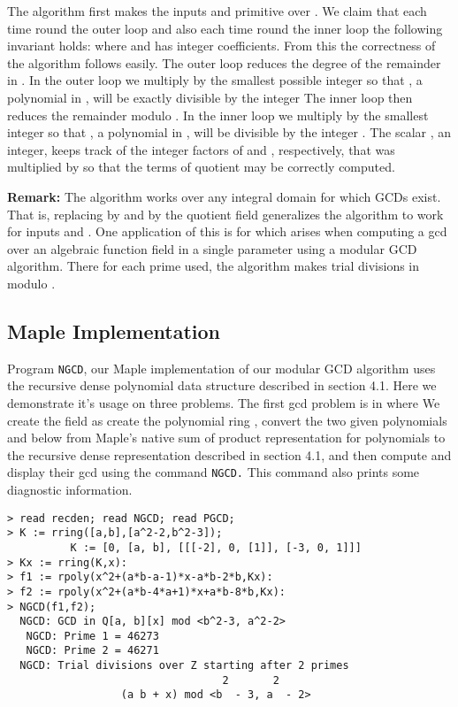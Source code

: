 \documentclass[10pt]{article}
\begin{document}
\noindent
The algorithm first makes the inputs  and  primitive over .
We claim that each time round the outer loop and also each time
round the inner loop the following invariant holds:
 where  and  has
integer coefficients.  From this the correctness of the
algorithm follows easily.
The outer loop reduces the degree of the remainder  in .
In the outer loop we multiply  by the smallest possible integer
so that , a polynomial in , will be exactly
divisible by the integer 
The inner loop then reduces the remainder  modulo .
In the inner loop we multiply  by the smallest integer
so that , a polynomial in , will be divisible by
the integer .
The scalar , an integer, keeps track of the integer factors
of  and , respectively, that  was multiplied
by so that the terms of quotient  may be correctly computed.

\medskip
\noindent
{\bf Remark:} The algorithm works over any integral domain  for which
GCDs exist.  That is, replacing  by  and  by the quotient
field  generalizes the algorithm to work for inputs
 and .  One application of this is
for  which arises when computing a gcd over an algebraic
function field in a single parameter  using a modular GCD algorithm.
There for each prime  used, the algorithm makes trial divisions
in  modulo .

 

\subsection{Maple Implementation}
Program {\tt NGCD}, our Maple implementation of our modular GCD
algorithm uses the recursive dense polynomial data structure
described in section 4.1. Here we demonstrate it's usage on three
problems. The first gcd problem is in  where   We create the field as  create the polynomial ring , convert the two given
polynomials  and  below from Maple's native sum of product
representation for polynomials to the recursive dense representation
described in section 4.1, and then compute and display their gcd
using the command {\tt NGCD.}  This command also prints some
diagnostic information.
{ \small
\begin{verbatim}
> read recden; read NGCD; read PGCD;
> K := rring([a,b],[a^2-2,b^2-3]);
          K := [0, [a, b], [[[-2], 0, [1]], [-3, 0, 1]]]
> Kx := rring(K,x):
> f1 := rpoly(x^2+(a*b-a-1)*x-a*b-2*b,Kx):
> f2 := rpoly(x^2+(a*b-4*a+1)*x+a*b-8*b,Kx):
> NGCD(f1,f2);
  NGCD: GCD in Q[a, b][x] mod <b^2-3, a^2-2>
   NGCD: Prime 1 = 46273
   NGCD: Prime 2 = 46271
  NGCD: Trial divisions over Z starting after 2 primes
                                  2       2
                  (a b + x) mod <b  - 3, a  - 2>
\end{verbatim}
}
\end{document}
